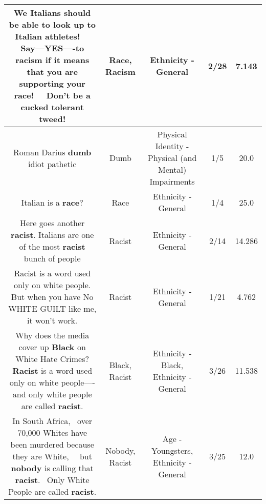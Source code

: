 \documentclass[11pt]{article}
\newlength\mylength
\begin{document}
\begin{center}
\begin{longtable}{|C{.65\mylength}|C{.30\mylength}|C{.12\mylength}|C{.12\mylength}|C{.12\mylength}|}
  \small We Italians should be able to look up to Italian athletes!   Say---YES----to \textbf{racism} if it means that you are supporting your \textbf{race}!   Don't be a cucked tolerant tweed!\normalsize   & Race, Racism & Ethnicity - General & 2/28 & 7.143 \\  \hline
  \small Roman Darius \textbf{dumb} idiot pathetic\normalsize   & Dumb & Physical Identity - Physical (and Mental) Impairments & 1/5 & 20.0 \\  \hline
  \small Italian is a \textbf{race}?\normalsize   & Race & Ethnicity - General & 1/4 & 25.0 \\  \hline
  \small Here goes another \textbf{racist}. Italians are one of the most \textbf{racist} bunch of people\normalsize   & Racist & Ethnicity - General & 2/14 & 14.286 \\  \hline
  \small Racist is a word used only on white people.  But when you have No WHITE GUILT like me,  it won't work.\normalsize   & Racist & Ethnicity - General & 1/21 & 4.762 \\  \hline
  \small Why does the media cover up \textbf{Black} on White Hate Crimes?   \textbf{Racist} is a word used only on white people----and only white people are called \textbf{racist}.\normalsize   & Black, Racist & Ethnicity - Black, Ethnicity - General & 3/26 & 11.538 \\  \hline
  \small In South Africa,  over 70,000 Whites have been murdered because they are White,   but \textbf{nobody} is calling that \textbf{racist}.  Only White People are called \textbf{racist}.\normalsize   & Nobody, Racist & Age - Youngsters, Ethnicity - General & 3/25 & 12.0 \\  \hline

\end{longtable}
\end{center}
\end{document}
